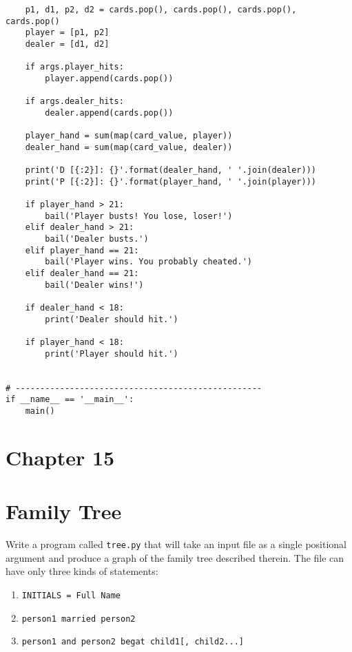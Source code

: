 \documentclass[]{article}
\providecommand{\tightlist}{%
  \setlength{\itemsep}{0pt}\setlength{\parskip}{0pt}}
\begin{document}
\begin{verbatim}
    p1, d1, p2, d2 = cards.pop(), cards.pop(), cards.pop(), cards.pop()
    player = [p1, p2]
    dealer = [d1, d2]

    if args.player_hits:
        player.append(cards.pop())

    if args.dealer_hits:
        dealer.append(cards.pop())

    player_hand = sum(map(card_value, player))
    dealer_hand = sum(map(card_value, dealer))

    print('D [{:2}]: {}'.format(dealer_hand, ' '.join(dealer)))
    print('P [{:2}]: {}'.format(player_hand, ' '.join(player)))

    if player_hand > 21:
        bail('Player busts! You lose, loser!')
    elif dealer_hand > 21:
        bail('Dealer busts.')
    elif player_hand == 21:
        bail('Player wins. You probably cheated.')
    elif dealer_hand == 21:
        bail('Dealer wins!')

    if dealer_hand < 18:
        print('Dealer should hit.')

    if player_hand < 18:
        print('Player should hit.')


# --------------------------------------------------
if __name__ == '__main__':
    main()
\end{verbatim}

\pagebreak

\hypertarget{chapter-15}{%
\section{Chapter 15}\label{chapter-15}}

\hypertarget{family-tree}{%
\section{Family Tree}\label{family-tree}}

Write a program called \texttt{tree.py} that will take an input file as
a single positional argument and produce a graph of the family tree
described therein. The file can have only three kinds of statements:

\begin{enumerate}
\def\labelenumi{\arabic{enumi}.}
\tightlist
\item
  \texttt{INITIALS\ =\ Full\ Name}
\item
  \texttt{person1\ married\ person2}
\item
  \texttt{person1\ and\ person2\ begat\ child1{[},\ child2...{]}}
\end{enumerate}
\end{document}
